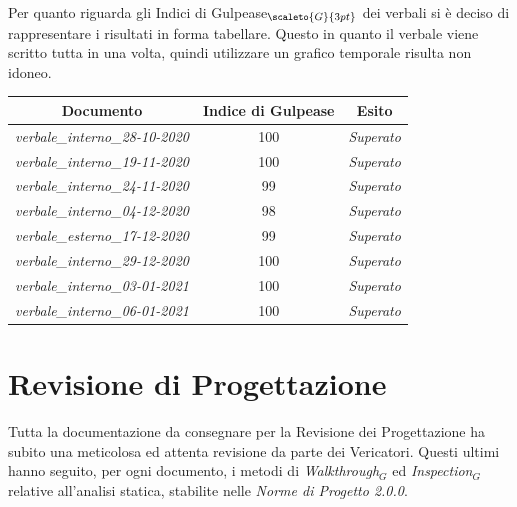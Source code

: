{Per quanto riguarda gli Indici di Gulpease$_{\scaleto{G}{3pt}}$ dei verbali si è deciso di rappresentare i risultati in forma tabellare.
Questo in quanto il verbale viene scritto tutta in una volta, quindi utilizzare un grafico temporale risulta non idoneo.
\quad
\def\tabularxcolumn#1{m{#1}}
{
	\begin{center}
		\renewcommand{\arraystretch}{1.4}
		\begin{tabularx}{11.65cm}{|c|c|c|}
			\hline
			\rowcolor{airforceblue}
			\textbf{Documento} & \textbf{Indice di Gulpease} & \textbf{Esito}\\
			\hline
			\textit{verbale\_interno\_28-10-2020} & 100  & \textit{Superato}\\
			\hline
			\textit{verbale\_interno\_19-11-2020} & 100 & \textit{Superato}\\
			\hline
			\textit{verbale\_interno\_24-11-2020} & 99 & \textit{Superato}\\
			\hline
			\textit{verbale\_interno\_04-12-2020} & 98 & \textit{Superato}\\
			\hline
			\textit{verbale\_esterno\_17-12-2020} & 99 & \textit{Superato}\\
			\hline
			\textit{verbale\_interno\_29-12-2020} & 100 & \textit{Superato}\\
			\hline
			\textit{verbale\_interno\_03-01-2021} & 100 & \textit{Superato}\\
			\hline
			\textit{verbale\_interno\_06-01-2021} & 100 & \textit{Superato}\\
			\hline
		\end{tabularx}
	\end{center}

\section{Revisione di Progettazione} \label{ResocontoAttivitàDiVerificaRevisioneDiProgettazione}
Tutta la documentazione da consegnare per la Revisione dei Progettazione ha subito una meticolosa ed attenta revisione da parte dei Vericatori. Questi ultimi
hanno seguito, per ogni documento, i metodi di \textit{Walkthrough$_G$} ed \textit{Inspection$_G$} relative all'analisi statica, stabilite nelle \textit{Norme di Progetto 2.0.0}.

}}
